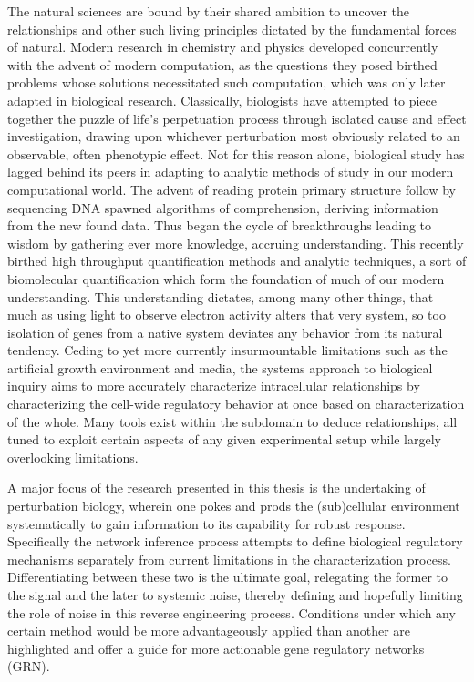 The natural sciences are bound by their shared ambition to uncover the relationships and other such living principles dictated by the fundamental forces of natural. Modern research in chemistry and physics developed concurrently with the advent of modern computation, as the questions they posed birthed problems whose solutions necessitated such computation, which was only later adapted in biological research. Classically, biologists have attempted to piece together the puzzle of life's perpetuation process through isolated cause and effect investigation, drawing upon whichever perturbation most obviously related to an observable, often phenotypic effect. Not for this reason alone, biological study has lagged behind its peers in adapting to analytic methods of study in our modern computational world. The advent of reading protein primary structure follow by sequencing DNA spawned algorithms of comprehension, deriving information from the new found data. Thus began the cycle of breakthroughs leading to wisdom by gathering ever more knowledge, \ie accruing understanding. This recently birthed high throughput quantification methods and analytic techniques, a sort of biomolecular quantification which form the foundation of much of our modern understanding. This understanding dictates, among many other things, that much as using light to observe electron activity alters that very system, so too isolation of genes from a native system deviates any behavior from its natural tendency. Ceding to yet more currently insurmountable limitations such as the artificial growth environment and media, the systems approach to biological inquiry aims to more accurately characterize intracellular relationships by characterizing the cell-wide regulatory behavior at once based on characterization of the whole. Many tools exist within the subdomain to deduce relationships, all tuned to exploit certain aspects of any given experimental setup while largely overlooking limitations.

A major focus of the research presented in this thesis is the undertaking of perturbation biology, wherein one pokes and prods the (sub)cellular environment systematically to gain information to its capability for robust response. Specifically the network inference process attempts to define biological regulatory mechanisms separately from current limitations in the characterization process. Differentiating between these two is the ultimate goal, relegating the former to the signal and the later to systemic noise, thereby defining and hopefully limiting the role of noise in this reverse engineering process. Conditions under which any certain method would be more advantageously applied than another are highlighted and offer a guide for more actionable gene regulatory networks (GRN). 

